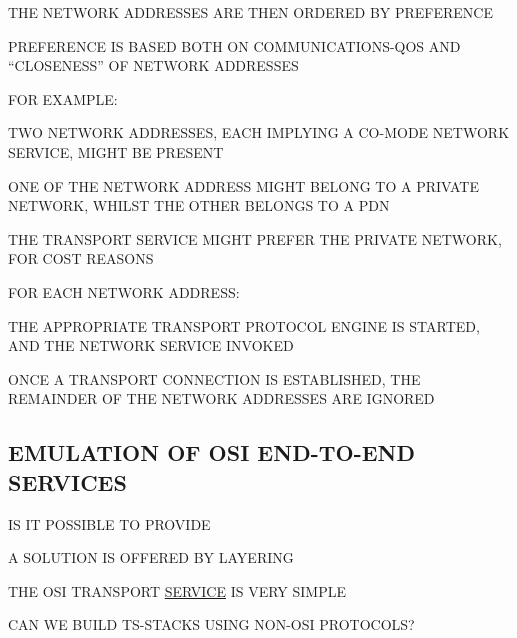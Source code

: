 \begin{bwslide}

\begin{nrtc}
\item	THE NETWORK ADDRESSES ARE THEN ORDERED BY PREFERENCE

\item	PREFERENCE IS BASED BOTH ON COMMUNICATIONS-QOS AND ``CLOSENESS''
	OF NETWORK ADDRESSES

\item	FOR EXAMPLE:
    \begin{nrtc}
    \item	TWO NETWORK ADDRESSES, EACH IMPLYING A CO-MODE NETWORK
		SERVICE, MIGHT BE PRESENT

    \item	ONE OF THE NETWORK ADDRESS MIGHT BELONG TO A PRIVATE
		NETWORK, WHILST THE OTHER BELONGS TO A PDN

    \item	THE TRANSPORT SERVICE MIGHT PREFER THE PRIVATE NETWORK,
		FOR COST REASONS
    \end{nrtc}
\end{nrtc}
\end{bwslide}


\begin{bwslide}

\begin{nrtc}
\item	FOR EACH NETWORK ADDRESS:
    \begin{nrtc}
    \item	THE APPROPRIATE TRANSPORT PROTOCOL ENGINE IS STARTED,
		AND THE NETWORK SERVICE INVOKED

    \item	ONCE A TRANSPORT CONNECTION IS ESTABLISHED,
		THE REMAINDER OF THE NETWORK ADDRESSES ARE IGNORED
    \end{nrtc}
\end{nrtc}
\end{bwslide}


\begin{bwslide}
\part*	{EMULATION OF OSI END-TO-END SERVICES}\bf

\begin{nrtc}
\item	IS IT POSSIBLE TO PROVIDE

\item	A SOLUTION IS OFFERED BY LAYERING
    \begin{nrtc}
    \item	THE OSI TRANSPORT \underline{SERVICE} IS VERY SIMPLE
    \end{nrtc}

\item	CAN WE BUILD TS-STACKS USING NON-OSI PROTOCOLS?
\end{nrtc}
\end{bwslide}


